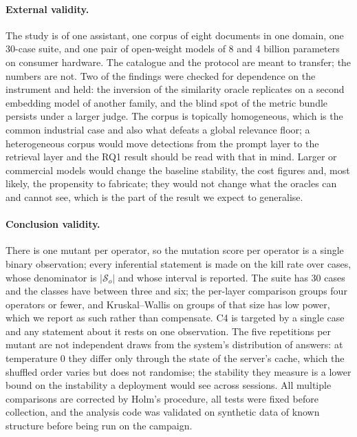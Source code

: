 \documentclass[a4paper,fleqn]{cas-dc}
\newcommand{\Sset}{\mathcal{S}}
\begin{document}
\paragraph{External validity.} The study is of one assistant, one corpus of
eight documents in one domain, one 30-case suite, and one pair of open-weight
models of 8 and 4 billion parameters on consumer hardware. The catalogue and
the protocol are meant to transfer; the numbers are not. Two of the findings
were checked for dependence on the instrument and held: the inversion of the
similarity oracle replicates on a second embedding model of another family,
and the blind spot of the metric bundle persists under a larger judge. The
corpus is topically homogeneous, which is the common industrial case and also
what defeats a global relevance floor; a heterogeneous corpus would move
detections from the prompt layer to the retrieval layer and the RQ1 result
should be read with that in mind. Larger or commercial models would change the
baseline stability, the cost figures and, most likely, the propensity to
fabricate; they would not change what the oracles can and cannot see, which
is the part of the result we expect to generalise.

\paragraph{Conclusion validity.} There is one mutant per operator, so the
mutation score per operator is a single binary observation; every inferential
statement is made on the kill rate over cases, whose denominator is
$|\Sset_o|$ and whose interval is reported. The suite has 30 cases and the
classes have between three and six; the per-layer comparison groups four
operators or fewer, and Kruskal--Wallis on groups of that size has low power,
which we report as such rather than compensate. C4 is targeted by a single
case and any statement about it rests on one observation. The five
repetitions per mutant are not independent draws from the system's
distribution of answers: at temperature 0 they differ only through the state
of the server's cache, which the shuffled order varies but does not
randomise; the stability they measure is a lower bound on the instability a
deployment would see across sessions. All multiple
comparisons are corrected by Holm's procedure, all tests were fixed before
collection, and the analysis code was validated on synthetic data of known
structure before being run on the campaign.

\end{document}
